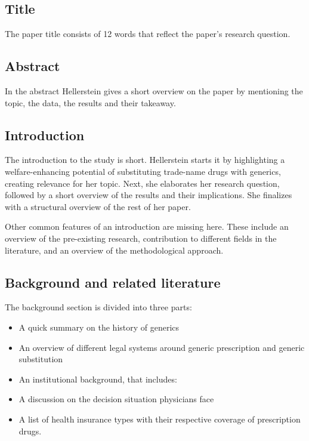 \documentclass[
]{book}
\providecommand{\tightlist}{%
  \setlength{\itemsep}{0pt}\setlength{\parskip}{0pt}}
\begin{document}
\hypertarget{title}{%
\subsection{Title}\label{title}}

The paper title consists of 12 words that reflect the paper's research
question.

\hypertarget{abstract}{%
\subsection{Abstract}\label{abstract}}

In the abstract Hellerstein gives a short overview on the paper by
mentioning the topic, the data, the results and their takeaway.

\hypertarget{introduction}{%
\subsection{Introduction}\label{introduction}}

The introduction to the study is short. Hellerstein starts it by
highlighting a welfare-enhancing potential of substituting trade-name
drugs with generics, creating relevance for her topic. Next, she
elaborates her research question, followed by a short overview of the
results and their implications. She finalizes with a structural overview
of the rest of her paper.

Other common features of an introduction are missing here. These include
an overview of the pre-existing research, contribution to different
fields in the literature, and an overview of the methodological
approach.

\hypertarget{background-and-related-literature}{%
\subsection{Background and related
literature}\label{background-and-related-literature}}

The background section is divided into three parts:

\begin{itemize}
\tightlist
\item
  A quick summary on the history of generics
\item
  An overview of different legal systems around generic prescription and
  generic substitution
\item
  An institutional background, that includes:
\item
  A discussion on the decision situation physicians face
\item
  A list of health insurance types with their respective coverage of
  prescription drugs.
\end{itemize}
\end{document}
